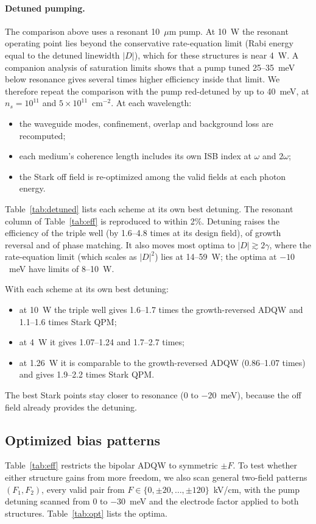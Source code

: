 \documentclass[11pt]{article}
\begin{document}
\paragraph{Detuned pumping.} The comparison above uses a resonant 10~$\mu$m pump. At 10~W the resonant operating point lies beyond the conservative rate-equation limit (Rabi energy equal to the detuned linewidth $|D|$), which for these structures is near 4~W. A companion analysis of saturation limits \cite{OwnbyNL02} shows that a pump tuned 25--35~meV below resonance gives several times higher efficiency inside that limit. We therefore repeat the comparison with the pump red-detuned by up to 40~meV, at $n_s=10^{11}$ and $5\times10^{11}$~cm$^{-2}$. At each wavelength:
\begin{itemize}
\item the waveguide modes, confinement, overlap and background loss are recomputed;
\item each medium's coherence length includes its own ISB index at $\omega$ and $2\omega$;
\item the Stark off field is re-optimized among the valid fields at each photon energy.
\end{itemize}
Table~\ref{tab:detuned} lists each scheme at its own best detuning. The resonant column of Table~\ref{tab:eff} is reproduced to within 2\%. Detuning raises the efficiency of the triple well (by 1.6--4.8 times at its design field), of growth reversal and of phase matching. It also moves most optima to $|D|\gtrsim2\gamma$, where the rate-equation limit (which scales as $|D|^2$) lies at 14--59~W; the optima at $-10$~meV have limits of 8--10~W.

With each scheme at its own best detuning:
\begin{itemize}
\item at 10~W the triple well gives 1.6--1.7 times the growth-reversed ADQW and 1.1--1.6 times Stark QPM;
\item at 4~W it gives 1.07--1.24 and 1.7--2.7 times;
\item at 1.26~W it is comparable to the growth-reversed ADQW (0.86--1.07 times) and gives 1.9--2.2 times Stark QPM.
\end{itemize}
The best Stark points stay closer to resonance ($0$ to $-20$~meV), because the off field already provides the detuning.

\subsection{Optimized bias patterns}\label{sec:opt}
Table~\ref{tab:eff} restricts the bipolar ADQW to symmetric $\pm F$. To test whether either structure gains from more freedom, we also scan general two-field patterns $(F_1,F_2)$, every valid pair from $F\in\{0,\pm20,\dots,\pm120\}$~kV/cm, with the pump detuning scanned from 0 to $-30$~meV and the electrode factor applied to both structures. Table~\ref{tab:opt} lists the optima.
\end{document}
